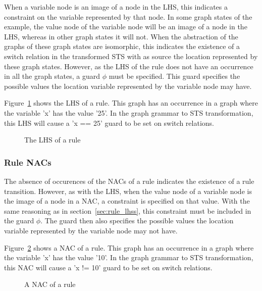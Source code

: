 When a variable node is an image of a node in the LHS, this indicates a constraint on the variable represented by that node. In some graph states of the example, the value node of the variable node will be an image of a node in the LHS, whereas in other graph states it will not. When the abstraction of the graphs of these graph states are isomorphic, this indicates the existence of a switch relation in the transformed STS with as source the location represented by these graph states. However, as the LHS of the rule does not have an occurrence in all the graph states, a guard $\phi$ must be specified. This guard specifies the possible values the location variable represented by the variable node may have. 

Figure~\ref{fig:lhs_trafo} shows the LHS of a rule. This graph has an occurrence in a graph where the variable 'x' has the value '25'. In the graph grammar to STS transformation, this LHS will cause a 'x == 25' guard to be set on switch relations.

\begin{figure}[ht]
  \begin{center}
    
  \end{center}
  \caption{The LHS of a rule}
  \label{fig:lhs_trafo}
\end{figure}

\subsubsection{Rule NACs}
The absence of occurences of the NACs of a rule indicates the existence of a rule transition. However, as with the LHS, when the value node of a variable node is the image of a node in a NAC, a constraint is specified on that value. With the same reasoning as in section~\ref{sec:rule_lhss}, this constraint must be included in the guard $\phi$. The guard then also specifies the possible values the location variable represented by the variable node may not have.

Figure~\ref{fig:nac_trafo} shows a NAC of a rule. This graph has an occurrence in a graph where the variable 'x' has the value '10'. In the graph grammar to STS transformation, this NAC will cause a 'x != 10' guard to be set on switch relations.

\begin{figure}[ht]
  \begin{center}
    
  \end{center}
  \caption{A NAC of a rule}
  \label{fig:nac_trafo}
\end{figure}

